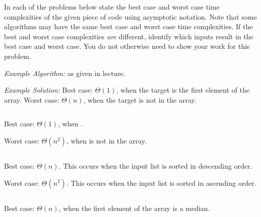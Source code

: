 \begin{prob}
    In each of the problems below state the best case and worst case time
    complexities of the given piece of code using asymptotic notation. Note that
    some algorithms may have the same best case and worst case time complexities. If
    the best and worst case complexities \emph{are} different, identify which
    inputs result in the best case and worst case. You do not otherwise need to show your work for
    this problem.

    \emph{Example Algorithm:}  as given in lecture. 

    \emph{Example Solution:}
    Best case: $\Theta(1)$, when the target is the first element of the array.
    Worst case: $\Theta(n)$, when the target is not in the array.

    \begin{subprobset}
        \begin{subprob}
            \inputminted{python}{\thisdir/include/part_a.py} 

            \begin{soln}
                Best case: $\Theta(1)$, when .

                Worst case: $\Theta(n^2)$, when  is not in the array.
            \end{soln}
        \end{subprob}

        \begin{subprob}
            \inputminted{python}{\thisdir/include/part_b.py}
            

            \begin{soln}
                Best case: 
                    $\Theta(n)$.
                    This occurs when the input list is sorted in descending order.

                Worst case: 
                    $\Theta(n^2)$. This occurs when the input list is sorted in ascending order.
            \end{soln}
        \end{subprob}

        \begin{subprob}
            \inputminted{python}{\thisdir/include/part_c.py} 
            

            \begin{soln}
                Best case: $\Theta(n)$, when the first element of the array is a median.


\end{soln}
\end{subprob}
\end{subprobset}
\end{prob}
